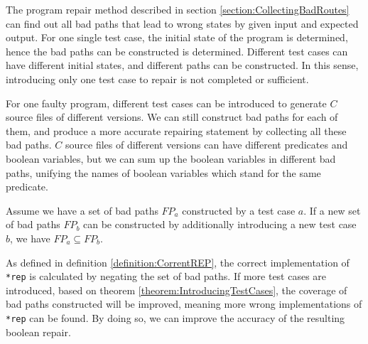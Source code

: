 The program repair method described in section \ref{section:CollectingBadRoutes} can find out all bad paths that lead to wrong states by given input and expected output.
For one single test case, the initial state of the program is determined, hence the bad paths can be constructed is determined.
Different test cases can have different initial states, and different paths can be constructed.
In this sense, introducing only one test case to repair is not completed or sufficient.

For one faulty program, different test cases can be introduced to generate $C$ source files of different versions.
We can still construct bad paths for each of them, and produce a more accurate repairing statement by collecting all these bad paths.
$C$ source files of different versions can have different predicates and boolean variables,
but we can sum up the boolean variables in different bad paths, unifying the names of boolean variables which stand for the same predicate.

\begin{theorem}
\label{theorem:IntroducingTestCases}
Assume we have a set of bad paths $FP_{a}$ constructed by a test case $a$. If a new set of bad paths $FP_{b}$ can be constructed by additionally introducing a new test case $b$,
we have $FP_{a} \subseteq FP_{b}$.
\end{theorem}

As defined in definition \ref{definition:CorrentREP}, the correct implementation of \lstinline|*rep| is calculated by negating the set of bad paths. If more test cases are introduced, based on theorem \ref{theorem:IntroducingTestCases}, the coverage of bad paths constructed will be improved, meaning more wrong implementations of \lstinline|*rep| can be found. By doing so, we can improve the accuracy of the resulting boolean repair.

